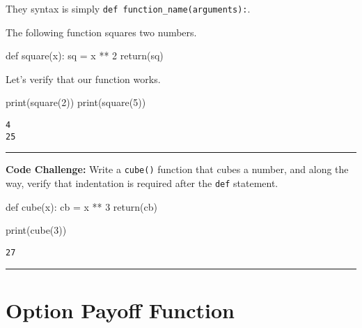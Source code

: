 \documentclass[
  letterpaper,
  DIV=11,
  numbers=noendperiod]{scrreprt}
\newenvironment{Shaded}{\begin{snugshade}}{\end{snugshade}}
\newcommand{\BuiltInTok}[1]{\textcolor[rgb]{0.00,0.23,0.31}{#1}}
\newcommand{\ControlFlowTok}[1]{\textcolor[rgb]{0.00,0.23,0.31}{#1}}
\newcommand{\DecValTok}[1]{\textcolor[rgb]{0.68,0.00,0.00}{#1}}
\newcommand{\KeywordTok}[1]{\textcolor[rgb]{0.00,0.23,0.31}{#1}}
\newcommand{\NormalTok}[1]{\textcolor[rgb]{0.00,0.23,0.31}{#1}}
\newcommand{\OperatorTok}[1]{\textcolor[rgb]{0.37,0.37,0.37}{#1}}
\begin{document}
They syntax is simply \texttt{def\ function\_name(arguments):}.

The following function squares two numbers.

\begin{Shaded}
\begin{Highlighting}[]
\KeywordTok{def}\NormalTok{ square(x):}
\NormalTok{    sq }\OperatorTok{=}\NormalTok{ x }\OperatorTok{**} \DecValTok{2}
    \ControlFlowTok{return}\NormalTok{(sq)}
\end{Highlighting}
\end{Shaded}

Let's verify that our function works.

\begin{Shaded}
\begin{Highlighting}[]
\BuiltInTok{print}\NormalTok{(square(}\DecValTok{2}\NormalTok{))}
\BuiltInTok{print}\NormalTok{(square(}\DecValTok{5}\NormalTok{))}
\end{Highlighting}
\end{Shaded}

\begin{verbatim}
4
25
\end{verbatim}

\begin{center}\rule{0.5\linewidth}{0.5pt}\end{center}

\textbf{Code Challenge:} Write a \texttt{cube()} function that cubes a
number, and along the way, verify that indentation is required after the
\texttt{def} statement.

\begin{Shaded}
\begin{Highlighting}[]
\KeywordTok{def}\NormalTok{ cube(x):}
\NormalTok{    cb }\OperatorTok{=}\NormalTok{ x }\OperatorTok{**} \DecValTok{3}
    \ControlFlowTok{return}\NormalTok{(cb)}

\BuiltInTok{print}\NormalTok{(cube(}\DecValTok{3}\NormalTok{))}
\end{Highlighting}
\end{Shaded}

\begin{verbatim}
27
\end{verbatim}

\begin{center}\rule{0.5\linewidth}{0.5pt}\end{center}

\hypertarget{option-payoff-function}{%
\section{Option Payoff Function}\label{option-payoff-function}}
\end{document}
